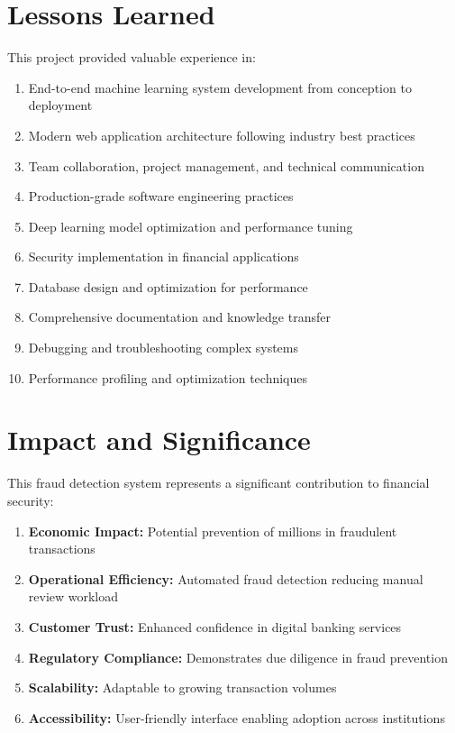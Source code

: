 \documentclass[12pt,a4paper,twoside]{report}
\begin{document}
\section*{Lessons Learned}

This project provided valuable experience in:

\begin{enumerate}
    \item End-to-end machine learning system development from conception to deployment
    \item Modern web application architecture following industry best practices
    \item Team collaboration, project management, and technical communication
    \item Production-grade software engineering practices
    \item Deep learning model optimization and performance tuning
    \item Security implementation in financial applications
    \item Database design and optimization for performance
    \item Comprehensive documentation and knowledge transfer
    \item Debugging and troubleshooting complex systems
    \item Performance profiling and optimization techniques
\end{enumerate}

\section*{Impact and Significance}

This fraud detection system represents a significant contribution to financial security:

\begin{enumerate}
    \item \textbf{Economic Impact:} Potential prevention of millions in fraudulent transactions
    \item \textbf{Operational Efficiency:} Automated fraud detection reducing manual review workload
    \item \textbf{Customer Trust:} Enhanced confidence in digital banking services
    \item \textbf{Regulatory Compliance:} Demonstrates due diligence in fraud prevention
    \item \textbf{Scalability:} Adaptable to growing transaction volumes
    \item \textbf{Accessibility:} User-friendly interface enabling adoption across institutions
\end{enumerate}
\end{document}
